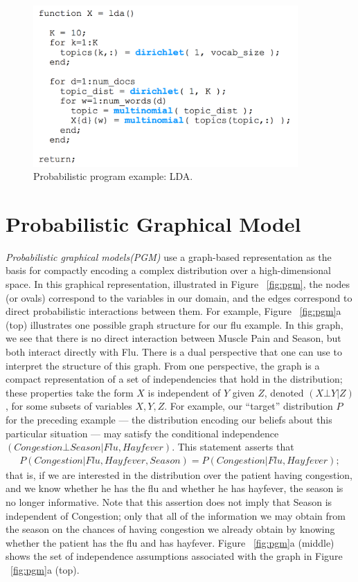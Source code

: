 \begin{figure}
    \centering
    \includegraphics[width=0.9\textwidth]{figures/lda_eg.png}
    \caption{Probabilistic program example: LDA.}
    \label{fig:lda}
\end{figure}


\section{Probabilistic Graphical Model}
\label{sec:pgm}

\textit{Probabilistic graphical models(PGM)} use a graph-based representation as the basis for compactly encoding a complex distribution over a high-dimensional space. In this graphical representation, illustrated in Figure ~\ref{fig:pgm}, the nodes (or ovals) correspond to the variables in our domain, and the edges correspond to direct probabilistic interactions between them. For example, Figure ~\ref{fig:pgm}a (top) illustrates one possible graph structure for our flu example. In this graph, we see that there is no direct interaction between Muscle Pain and Season, but both interact directly with Flu. There is a dual perspective that one can use to interpret the structure of this graph. From one perspective, the graph is a compact representation of a set of independencies that hold in the distribution; these properties take the form $X$ is independent of $Y$ given $Z$, denoted $(X \bot Y | Z)$, for some subsets of variables $X,Y ,Z$. For example, our “target” distribution $P$ for the preceding example — the distribution encoding our beliefs about this particular
situation — may satisfy the conditional independence $(Congestion \bot Season | Flu, Hayfever)$. This statement asserts that
\begin{align*}
P(Congestion | Flu, Hayfever, Season) = P(Congestion | Flu, Hayfever);
\end{align*}
that is, if we are interested in the distribution over the patient having congestion, and we know whether he has the flu and whether he has hayfever, the season is no longer informative. Note that this assertion does not imply that Season is independent of Congestion; only that all of the information we may obtain from the season on the chances of having congestion we already obtain by knowing whether the patient has the flu and has hayfever. Figure ~\ref{fig:pgm}a (middle) shows the set of independence assumptions associated with the graph in Figure ~\ref{fig:pgm}a (top).

